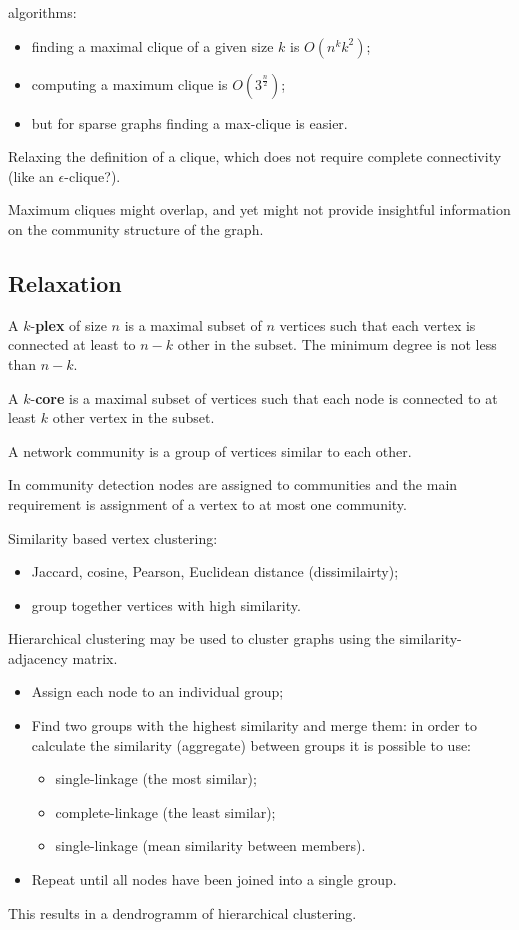 \documentclass[a4paper]{article}
\begin{document}
algorithms: \begin{itemize}
	\item finding a maximal clique of a given size $k$ is $O(n^kk^2)$;
	\item computing a maximum clique is $O(3^\frac{n}{2})$;
	\item but for sparse graphs finding a max-clique is easier.
\end{itemize}

Relaxing the definition of a clique, which does not require complete connectivity (like an $\epsilon$-clique?).

Maximum cliques might overlap, and yet might not provide insightful information on the community structure of the graph.

\subsection{Relaxation} %
\label{sub:relaxation}

A $k$-\textbf{plex} of size $n$ is a maximal subset of $n$ vertices such that each vertex is connected at least to $n-k$ other in the subset. The minimum degree is not less than $n-k$.

A $k$-\textbf{core} is a maximal subset of vertices such that each node is connected to at least $k$ other vertex in the subset.


A network community is a group of vertices similar to each other.

In community detection nodes are assigned to communities and the main requirement is assignment of a vertex to at most one community.

Similarity based vertex clustering:
\begin{itemize}
	\item Jaccard, cosine, Pearson, Euclidean distance (dissimilairty);
	\item group together vertices with high similarity.
\end{itemize}

Hierarchical clustering may be used to cluster graphs using the similarity-adjacency matrix.
\begin{itemize}
	\item Assign each node to an individual group;
	\item Find two groups with the highest similarity and merge them:
		in order to calculate the similarity (aggregate) between groups it is possible to use: \begin{itemize}
			\item single-linkage (the most similar);
			\item complete-linkage (the least similar);
			\item single-linkage (mean similarity between members).
		\end{itemize}
	\item Repeat until all nodes have been joined into a single group.
\end{itemize}
This results in a dendrogramm of hierarchical clustering.
\end{document}
